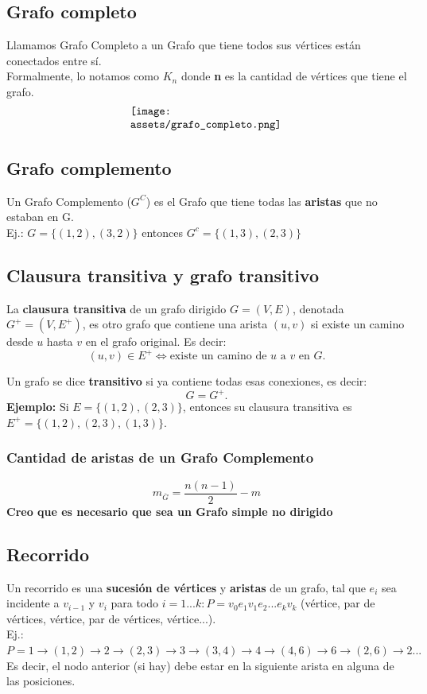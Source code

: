 \documentclass[10pt,a4paper]{article}
\begin{document}
\subsection*{Grafo completo}
Llamamos Grafo Completo a un Grafo que tiene todos sus vértices están conectados entre sí. \\
Formalmente, lo notamos como $K_{n}$ donde \textbf{n} es la cantidad de vértices que tiene el grafo.
\[\begin{minipage}[b]{0.4\textwidth} 
    \texttt{[image: assets/grafo\_completo.png]}
\end{minipage}\]
\subsection*{Grafo complemento}
Un Grafo Complemento ($G^{C}$) es el Grafo que tiene todas las \textbf{aristas} que no estaban en G. \\
Ej.: $G = \{(1, 2), (3, 2)\}$ entonces $ G^{c} = \{(1, 3), (2, 3)\}$
\subsection*{Clausura transitiva y grafo transitivo}

La \textbf{clausura transitiva} de un grafo dirigido \(G = (V, E)\), denotada \(G^+ = (V, E^+)\), es otro grafo que contiene una arista \((u,v)\) si existe un camino desde \(u\) hasta \(v\) en el grafo original. Es decir:
\[
(u,v) \in E^+ \iff \text{existe un camino de } u \text{ a } v \text{ en } G.
\]

Un grafo se dice \textbf{transitivo} si ya contiene todas esas conexiones, es decir:
\[
G = G^+.
\]
\textbf{Ejemplo:} Si \(E = \{(1,2), (2,3)\}\), entonces su clausura transitiva es \(E^+ = \{(1,2), (2,3), (1,3)\}\).
\subsubsection*{Cantidad de aristas de un Grafo Complemento}
\[m_{\overline{G}} = \frac{n(n-1)}{2} - m\]
\textbf{Creo que es necesario que sea un Grafo simple no dirigido}
\subsection*{Recorrido}
Un recorrido es una \textbf{sucesión de vértices} y \textbf{aristas} de un grafo, tal que $e_{i}$ sea incidente a $v_{i-1}$ y $v_{i}$ para todo $i = 1...k : P = v_{0}e_{1}v_{1}e_{2}...e_{k}v_{k}$ (vértice, par de vértices, vértice, par de vértices, vértice...). \\
Ej.: $P = 1 \rightarrow (1,2) \rightarrow 2 \rightarrow (2,3) \rightarrow 3 \rightarrow (3,4) \rightarrow 4 \rightarrow (4,6) \rightarrow 6 \rightarrow (2,6) \rightarrow 2 ...$ \\
Es decir, el nodo anterior (si hay) debe estar en la siguiente arista en alguna de las posiciones.
\end{document}
